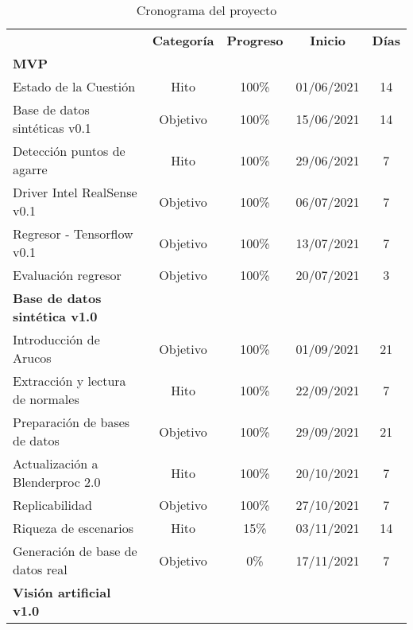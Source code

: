 \begin{table}[htbp]
  \centering
  \caption{Cronograma del proyecto}
    \begin{tabular}{p{16.5em}cccc}
    \rowcolor[rgb]{ .251,  .251,  .251} \multicolumn{1}{c}{\textcolor[rgb]{ 1,  1,  1}{\textbf{Descripción del hito}}} & \multicolumn{1}{c}{\textcolor[rgb]{ 1,  1,  1}{\textbf{Categoría}}} & \multicolumn{1}{c}{\textcolor[rgb]{ 1,  1,  1}{\textbf{Progreso}}} & \multicolumn{1}{c}{\textcolor[rgb]{ 1,  1,  1}{\textbf{Inicio}}} & \multicolumn{1}{c}{\textcolor[rgb]{ 1,  1,  1}{\textbf{Días}}} \\
    \rowcolor[rgb]{ .949,  .949,  .949} \textbf{MVP} &       &       &       &  \\
    Estado de la Cuestión & Hito  & 100\% & 01/06/2021 & 14  \\
    \rowcolor[rgb]{ .949,  .949,  .949} Base de datos sintéticas v0.1 & Objetivo & 100\% & 15/06/2021 & 14  \\
    Detección puntos de agarre & Hito  & 100\% & 29/06/2021 & 7  \\
    \rowcolor[rgb]{ .949,  .949,  .949} Driver Intel RealSense v0.1 & Objetivo & 100\% & 06/07/2021 & 7  \\
    Regresor - Tensorflow v0.1 & Objetivo & 100\% & 13/07/2021 & 7  \\
    \rowcolor[rgb]{ .949,  .949,  .949} Evaluación regresor & Objetivo & 100\% & 20/07/2021 & 3  \\
    \textbf{Base de datos sintética v1.0} &       &       &       &  \\
    \rowcolor[rgb]{ .949,  .949,  .949} Introducción de Arucos & Objetivo & 100\% & 01/09/2021 & 21  \\
    Extracción y lectura de normales & Hito  & 100\% & 22/09/2021 & 7  \\
    \rowcolor[rgb]{ .949,  .949,  .949} Preparación de bases de datos & Objetivo & 100\% & 29/09/2021 & 21  \\
    Actualización a Blenderproc 2.0 & Hito  & 100\% & 20/10/2021 & 7  \\
    \rowcolor[rgb]{ .949,  .949,  .949} Replicabilidad & Objetivo & 100\% & 27/10/2021 & 7  \\
    Riqueza de escenarios& Hito  & 15\% & 03/11/2021 & 14  \\
    \rowcolor[rgb]{ .949,  .949,  .949} Generación de base de datos real & Objetivo & 0\% & 17/11/2021 & 7  \\
    \textbf{Visión artificial v1.0} &       &       &       &  \\

\end{tabular}
\end{table}
